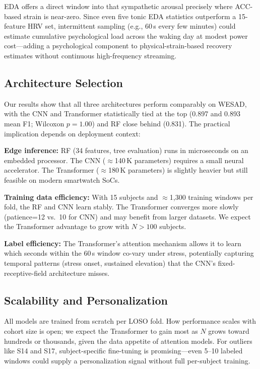 \documentclass[10pt,twocolumn]{article}
\begin{document}
EDA offers a direct window into that sympathetic arousal precisely where
ACC-based strain is near-zero. Since even five tonic EDA statistics outperform
a 15-feature HRV set, intermittent sampling (e.g., 60\,s every few minutes)
could estimate cumulative psychological load across the waking day at modest
power cost---adding a psychological component to physical-strain-based recovery
estimates without continuous high-frequency streaming.

\subsection{Architecture Selection}

Our results show that all three architectures perform comparably on WESAD,
with the CNN and Transformer statistically tied at the top (0.897 and 0.893
mean F1; Wilcoxon $p=1.00$) and RF close behind (0.831). The practical implication depends on deployment context:

\textbf{Edge inference:} RF (34 features, tree evaluation) runs in microseconds
on an embedded processor. The CNN ($\approx$140\,K parameters) requires a
small neural accelerator. The Transformer ($\approx$180\,K parameters) is
slightly heavier but still feasible on modern smartwatch SoCs.

\textbf{Training data efficiency:} With 15 subjects and $\approx$1,300
training windows per fold, the RF and CNN learn stably. The Transformer
converges more slowly (patience=12 vs.\ 10 for CNN) and may benefit from
larger datasets. We expect the Transformer advantage to grow with $N>100$ subjects.

\textbf{Label efficiency:} The Transformer's attention mechanism allows it
to learn which seconds within the 60\,s window co-vary under stress,
potentially capturing temporal patterns (stress onset, sustained elevation)
that the CNN's fixed-receptive-field architecture misses.

\subsection{Scalability and Personalization}

All models are trained from scratch per LOSO fold. How performance scales
with cohort size is open; we expect the Transformer to gain most as $N$ grows
toward hundreds or thousands, given the data appetite of attention models.
For outliers like S14 and S17, subject-specific fine-tuning is promising---even
5--10 labeled windows could supply a personalization signal without full
per-subject training.
\end{document}
